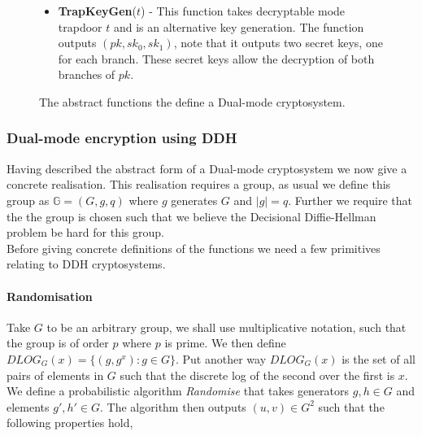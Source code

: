 \documentclass[ %
                    author={Nicholas Tutte},
                supervisor={Prof. Nigel Smart},
                    degree={MEng},
                     title={Secure Two Party Computation},
                  subtitle={A practical comparison of recent protocols},
                      type={Research - GG1K},
                      year={2015} ]{dissertation}
\begin{document}
\begin{figure}[!htb]
\begin{mdframed}
\begin{itemize}
								\item \textbf{TrapKeyGen}($t$) - This function takes decryptable mode trapdoor $t$ and is an alternative key generation. The function outputs $(pk, sk_0, sk_1)$, note that it outputs two secret keys, one for each branch. These secret keys allow the decryption of both branches of $pk$.
							\end{itemize}
						\end{mdframed}

						\caption{The abstract functions the define a Dual-mode cryptosystem. \label{fig:PVW_Abstract_Functions}}
					\end{figure}

				\subsubsection{Dual-mode encryption using DDH}

					Having described the abstract form of a Dual-mode cryptosystem we now give a concrete realisation. This realisation requires a group, as usual we define this group as $\mathbb{G} = (G, g, q)$ where $g$ generates $G$ and $|g| = q$. Further we require that the the group is chosen such that we believe the Decisional Diffie-Hellman problem be hard for this group.\\

					Before giving concrete definitions of the functions we need a few primitives relating to DDH cryptosystems.\\
					
					\paragraph{Randomisation} Take $G$ to be an arbitrary group, we shall use multiplicative notation, such that the group is of order $p$ where $p$ is prime. We then define $DLOG_G(x) = \{ (g, g^x) : g \in G\}$. Put another way $DLOG_G(x)$ is the set of all pairs of elements in $G$ such that the discrete log of the second over the first is $x$.\\
					
					We define a probabilistic algorithm \emph{Randomise} that takes generators $g,h \in G$ and elements $g', h' \in G$. The algorithm then outputs $(u, v) \in G^2$ such that the following properties hold,
					
\end{document}
